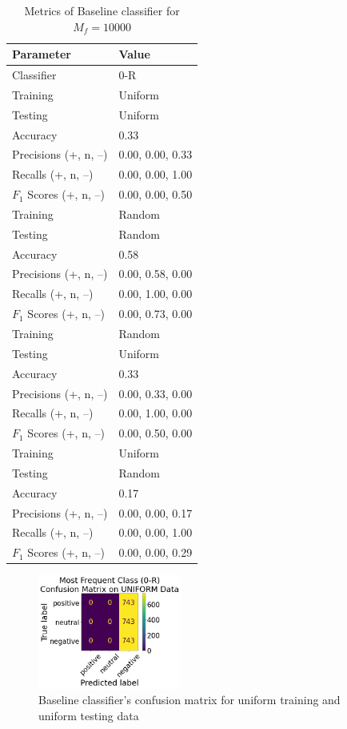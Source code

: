 \documentclass[11pt]{article}
\begin{document}
\begin{table}[!h]
	\begin{center}
		\begin{tabular}{|l|l|}			
			\hline
			Parameter & Value \\
			\hline\hline
			Classifier & 0-R \\
			\hline\hline
			Training & Uniform \\
			Testing & Uniform \\
			\hline
			Accuracy & 0.33 \\
			Precisions (+, n, --) 	& 0.00, 0.00, 0.33 \\
			Recalls (+, n, --) 		& 0.00, 0.00, 1.00 \\
			$F_1$ Scores (+, n, --) & 0.00, 0.00, 0.50 \\
			\hline\hline
			Training & Random \\
			Testing & Random \\
			\hline
			Accuracy & 0.58 \\
			Precisions (+, n, --) 	& 0.00, 0.58, 0.00 \\
			Recalls (+, n, --) 		& 0.00, 1.00, 0.00 \\
			$F_1$ Scores (+, n, --) & 0.00, 0.73, 0.00 \\
			\hline\hline
			Training & Random \\
			Testing & Uniform \\
			\hline
			Accuracy & 0.33 \\
			Precisions (+, n, --) 	& 0.00, 0.33, 0.00 \\
			Recalls (+, n, --) 		& 0.00, 1.00, 0.00 \\
			$F_1$ Scores (+, n, --) & 0.00, 0.50, 0.00 \\
			\hline\hline
			Training & Uniform \\
			Testing & Random \\
			\hline
			Accuracy & 0.17 \\
			Precisions (+, n, --) &  0.00, 0.00, 0.17 \\
			Recalls (+, n, --) & 0.00, 0.00, 1.00 \\
			$F_1$ Scores (+, n, --) & 0.00, 0.00, 0.29 \\
			\hline
		\end{tabular}
		\caption{Metrics of Baseline classifier for $M_f = 10000$}
		\label{tbl:metrics-base10000}
	\end{center}
\end{table}

\begin{figure}[!h]
	\centering
	\includegraphics[width = 0.42\textwidth]{cf/MostFrequentClass0R-Uniform-confusion-matrix.png}
	\caption{Baseline classifier's confusion matrix for uniform training and uniform testing data}
	\label{fig:cf-base-uu}
\end{figure} 
\end{document}
